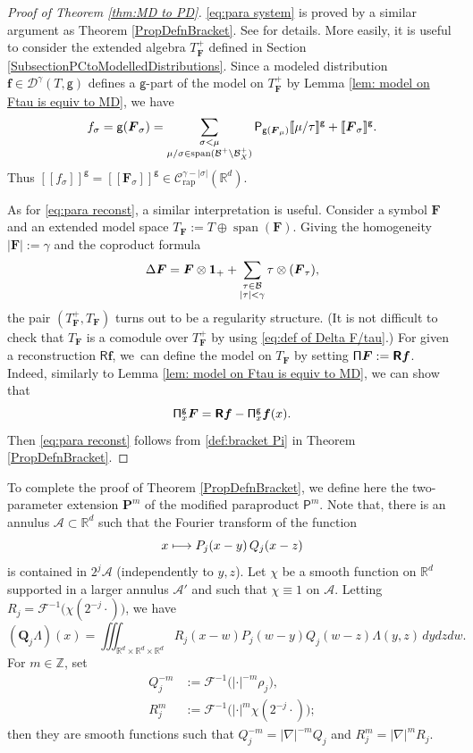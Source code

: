 \documentclass[JEP,XML,SOM,Unicode,published]{cedram}
\newcommand\mto{\mathchoice{\longmapsto}{\mapsto}{\mapsto}{\mapsto}}
\DeclareMathOperator{\Span}{span}
\theoremstyle{plain}
\theoremstyle{definition}
\newcommand{\Brac}[1]{[\![#1]\!]}
\newcommand{\bsf}{\boldsymbol{f}}
\newcommand{\rap}{\mathrm{rap}}
\newcommand{\bfP}{\mathbf{P}}
\newcommand{\bfQ}{\mathbf{Q}}
\newcommand{\reR}{\boldsymbol{\mathsf{R}}}
\newcommand{\sfP}{\mathsf{P}}
\newcommand{\sfg}{\mathsf{g}}
\newcommand{\bsF}{\boldsymbol{F}}
\newcommand{\bbR}{\mathbb{R}}
\newcommand{\bbZ}{\mathbb{Z}}
\newcommand{\mcA}{\mathcal{A}}
\newcommand{\mcB}{\mathcal{B}}
\newcommand{\mcC}{\mathcal{C}}
\newcommand{\mcD}{\mathcal{D}}
\newcommand{\mcF}{\mathcal{F}}
\begin{document}
\begin{proof}[Proof of Theorem \ref{thm:MD to PD}]
\eqref{eq:para system} is proved by a similar argument as Theorem \ref{PropDefnBracket}.
See \cite[Th.\,14]{BH} for details.
More easily, it is useful to consider the extended algebra $T_{\bsF}^+$ defined in Section \ref{SubsectionPCtoModelledDistributions}.
Since a modeled distribution $\bsf\in\mcD^\gamma(T,\sfg)$ defines a $\sfg$-part of the model on $T_{\bsF}^+$ by Lemma \ref{lem: model on Ftau is equiv to MD}, we have
\[
f_\sigma=\sfg(\bsF_\sigma)=\sum_{\substack{\sigma<\mu \\ \mu/\sigma\in\Span (\mcB^+\setminus\mcB_X^+)}}{\sf P}_{\sfg(\bsF_\mu)}\Brac{\mu/\tau}^{\sfg}+\Brac{\bsF_\sigma}^{\sfg}.
\]
Thus $\Brac{f_\sigma}^{\sfg}=\Brac{\bsF_\sigma}^{\sfg}\in\mcC_{\rap}^{\gamma-|\sigma|}(\bbR^d)$.

As for \eqref{eq:para reconst}, a similar interpretation is useful. Consider a symbol $\bsF$ and an extended model space $T_{\bsF}:=T\oplus\Span (\bsF)$. Giving the homogeneity $|\bsF|:=\gamma$ and the coproduct formula
\[
\Delta\bsF=\bsF\otimes{\bf1}_++\sum_{\substack{\tau\in\mcB\\|\tau|<\gamma}}\tau\otimes(\bsF_\tau),
\]
the pair $(T_{\bsF}^+,T_{\bsF})$ turns out to be a regularity structure. (It is not difficult to check that $T_{\bsF}$ is a comodule over $T_{\bsF}^+$ by using \eqref{eq:def of Delta F/tau}.)
For given a reconstruction $\reR\bsf$, we~can define the model on $T_{\bsF}$ by setting ${\sf\Pi}\bsF:=\reR\bsf$. Indeed, similarly to Lemma \ref{lem: model on Ftau is equiv to MD}, we can show that
\[
{\sf\Pi}_x^{\sfg}\bsF=\reR\bsf-{\sf\Pi}_x^{\sfg}\bsf(x).
\]
Then \eqref{eq:para reconst} follows from \eqref{def:bracket Pi} in Theorem \ref{PropDefnBracket}.
\end{proof}

To complete the proof of Theorem \ref{PropDefnBracket}, we define here the two-parameter extension $\bfP^m$ of the modified paraproduct $\sfP^m$. Note that, there is an annulus $\mcA\subset\bbR^d$ such that the Fourier transform of the function
\[
x\mto P_j(x-y)\,Q_j(x-z)
\]
is contained in $2^j\mcA$ (independently to $y,z$). Let $\chi$ be a smooth function on $\bbR^d$ supported in a larger annulus $\mcA'$ and such that $\chi\equiv1$ on $\mcA$. Letting $R_j=\mcF^{-1}\bigl(\chi(2^{-j}\cdot)\bigr)$, we have
\[
(\bfQ_j \Lambda)(x)=\iiint_{\bbR^d\times\bbR^d\times\bbR^d} R_j(x-w)P_j(w-y)Q_j(w-z) \Lambda(y,z)\,dydzdw.
\]
For $m\in\bbZ$, set
\begin{equation*} \begin{split}
Q_j^{-m} &:= \mcF^{-1}\bigl(|{\cdot}|^{-m}\rho_j\bigr), \\
R_j^m &:= \mcF^{-1}\bigl(|{\cdot}|^m\chi(2^{-j}\cdot)\bigr);
\end{split} \end{equation*}
then they are smooth functions such that $Q_j^{-m} = |\nabla|^{-m}Q_j$ and $R_j^m = |\nabla|^m R_j$.
\end{document}
